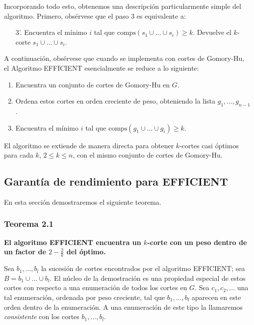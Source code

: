 \documentclass{article}
\begin{document}
Incorporando todo esto, obtenemos una descripción particularmente simple del algoritmo. Primero, obsérvese que el paso 3 es equivalente a:

\begin{enumerate}
    \item[3'.] Encuentra el mínimo $i$ tal que $\text{comps}(s_1 \cup \dots \cup s_i) \geq k$. Devuelve el $k$-corte $s_1 \cup \dots \cup s_i$.
\end{enumerate}

A continuación, obsérvese que cuando se implementa con cortes de Gomory-Hu, el Algoritmo \textsc{EFFICIENT} esencialmente se reduce a lo siguiente:

\begin{enumerate}
    \item Encuentra un conjunto de cortes de Gomory-Hu en $G$.
    \item Ordena estos cortes en orden creciente de peso, obteniendo la lista $g_1, \dots, g_{n-1}$.
    \item Encuentra el mínimo $i$ tal que $\text{comps}(g_1 \cup \dots \cup g_i) \geq k$.
\end{enumerate}

El algoritmo se extiende de manera directa para obtener $k$-cortes casi óptimos para cada $k$, $2 \leq k \leq n$, con el mismo conjunto de cortes de Gomory-Hu.

\subsection{Garantía de rendimiento para EFFICIENT}

En esta sección demostraremos el siguiente teorema.

\subsubsection*{Teorema 2.1}
\textbf{El algoritmo EFFICIENT encuentra un \( k \)-corte con un peso dentro de un factor de \( 2 - \frac{2}{k} \) del óptimo.}

Sea \( b_1, \dots, b_l \) la sucesión de cortes encontrados por el algoritmo EFFICIENT; sea \( B = b_1 \cup \dots \cup b_l \).  
El núcleo de la demostración es una propiedad especial de estos cortes con respecto a una enumeración de todos los cortes en \( G \). Sea \( c_1, c_2, \dots \) una tal enumeración, ordenada por peso creciente, tal que \( b_1, \dots, b_l \) aparecen en este orden dentro de la enumeración. A una enumeración de este tipo la llamaremos \emph{consistente} con los cortes \( b_1, \dots, b_l \).  
\end{document}
